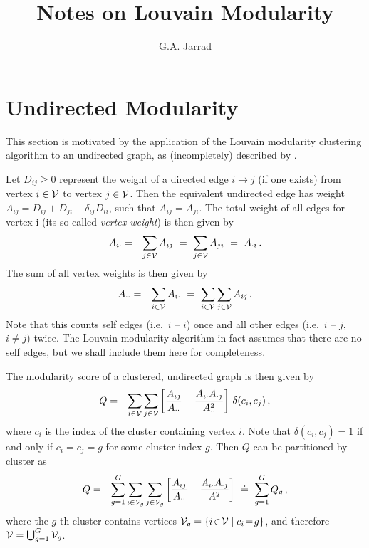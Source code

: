 \documentclass[a4paper]{article}
\title{Notes on Louvain Modularity}
\author{G.A. Jarrad}
\begin{document}
\maketitle
{}
\section{Undirected Modularity}\label{sec:Q}
This section is motivated by the application of the Louvain modularity clustering algorithm to an undirected graph,
as (incompletely) described by \cite{blondel08}.

Let $D_{ij}\ge 0$ represent the weight of a directed edge
$i\rightarrow j$ (if one exists) from vertex $i\in{\cal V}$ to vertex $j\in{\cal V}$. 
Then the equivalent undirected edge has weight
$A_{ij}=D_{ij}+D_{ji}-\delta_{ij}D_{ii}$, such that $A_{ij}=A_{ji}$. The total
weight of all edges for vertex i (its so-called {\em vertex weight}) is then given by
\begin{eqnarray}
  A_{i\cdot} & = & \sum_{j\in{\cal V}} A_{ij}~=~\sum_{j\in{\cal V}} A_{ji}~=~A_{\cdot i}\,.
\label{eq:in:out}
\end{eqnarray}
The sum of all vertex weights is then given by
\begin{eqnarray}
  A_{\cdot\cdot} & = & \sum_{i\in{\cal V}} A_{i\cdot}
  ~=~\sum_{i\in{\cal V}}\sum_{j\in{\cal V}} A_{ij}\,.
\end{eqnarray}
Note that this counts self edges (i.e.\ $i$ -- $i$) once and all other edges (i.e.\ $i$ -- $j$, 
$i\ne j$) twice. The Louvain modularity algorithm \cite{blondel08} in fact assumes that there are no self edges, but we
shall include them here for completeness.

The modularity score of a clustered, undirected graph is then given by
\begin{eqnarray}
  Q & = & \sum_{i\in{\cal V}}\sum_{j\in{\cal V}} \left[
  \frac{A_{ij}}{A_{\cdot\cdot}}-
  \frac{A_{i\cdot}A_{\cdot j}}{A_{\cdot\cdot}^2}
  \right]\,\delta(c_i,c_j)\,,
\end{eqnarray}
where $c_i$ is the index of the cluster containing vertex $i$. Note that
$\delta(c_i,c_j)=1$ if and only if $c_i=c_j=g$ for some cluster index $g$. Then $Q$ can be
partitioned by cluster as
\begin{eqnarray}
  Q & = & \sum_{g=1}^G\sum_{i\in{\cal V}_g}\sum_{j\in{\cal V}_g} \left[
  \frac{A_{ij}}{A_{\cdot\cdot}}-
  \frac{A_{i\cdot}A_{\cdot j}}{A_{\cdot\cdot}^2}
  \right]~\doteq~\sum_{g=1}^G Q_g\,,
\label{eq:Qg}
\end{eqnarray}
where the $g$-th cluster contains vertices ${\cal V}_g=\{i\!\in\!{\cal V}\;|\;c_i\!=\!g\}$,
and therefore ${\cal V}=\bigcup_{g=1}^G {\cal V}_g$.
\end{document}
